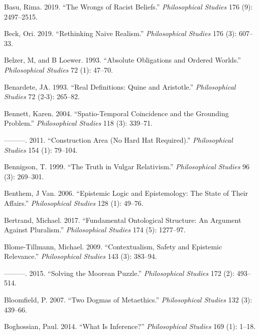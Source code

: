 \documentclass[
  10pt,
  letterpaper,
  DIV=11,
  numbers=noendperiod,
  twoside]{scrartcl}
\newlength{\cslhangindent}
\newenvironment{CSLReferences}[2] %
 {\begin{list}{}{%
  \setlength{\itemindent}{0pt}
  \setlength{\leftmargin}{0pt}
  \setlength{\parsep}{0pt}
  \ifodd #1
   \setlength{\leftmargin}{\cslhangindent}
   \setlength{\itemindent}{-1\cslhangindent}
  \fi
  \setlength{\itemsep}{#2\baselineskip}}}
 {\end{list}}
\begin{document}
\begin{CSLReferences}{1}{0}
Basu, Rima. 2019. {``The Wrongs of Racist Beliefs.''}
\emph{Philosophical Studies} 176 (9): 2497--2515.

Beck, Ori. 2019. {``Rethinking Naive Realism.''} \emph{Philosophical
Studies} 176 (3): 607--33.

Belzer, M, and B Loewer. 1993. {``Absolute Obligations and Ordered
Worlds.''} \emph{Philosophical Studies} 72 (1): 47--70.

Benardete, JA. 1993. {``Real Definitions: Quine and Aristotle.''}
\emph{Philosophical Studies} 72 (2-3): 265--82.

Bennett, Karen. 2004. {``Spatio-Temporal Coincidence and the Grounding
Problem.''} \emph{Philosophical Studies} 118 (3): 339--71.

---------. 2011. {``Construction Area (No Hard Hat Required).''}
\emph{Philosophical Studies} 154 (1): 79--104.

Bennigson, T. 1999. {``The Truth in Vulgar Relativism.''}
\emph{Philosophical Studies} 96 (3): 269--301.

Benthem, J Van. 2006. {``Epistemic Logic and Epistemology: The State of
Their Affairs.''} \emph{Philosophical Studies} 128 (1): 49--76.

Bertrand, Michael. 2017. {``Fundamental Ontological Structure: An
Argument Against Pluralism.''} \emph{Philosophical Studies} 174 (5):
1277--97.

Blome-Tillmann, Michael. 2009. {``Contextualism, Safety and Epistemic
Relevance.''} \emph{Philosophical Studies} 143 (3): 383--94.

---------. 2015. {``Solving the Moorean Puzzle.''} \emph{Philosophical
Studies} 172 (2): 493--514.

Bloomfield, P. 2007. {``Two Dogmas of Metaethics.''} \emph{Philosophical
Studies} 132 (3): 439--66.

Boghossian, Paul. 2014. {``What Is Inference?''} \emph{Philosophical
Studies} 169 (1): 1--18.


\end{CSLReferences}
\end{document}
